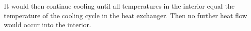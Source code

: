 It would then continue cooling until all temperatures in the interior equal the temperature of the cooling cycle in the heat exchanger. Then no further heat flow would occur into the interior.